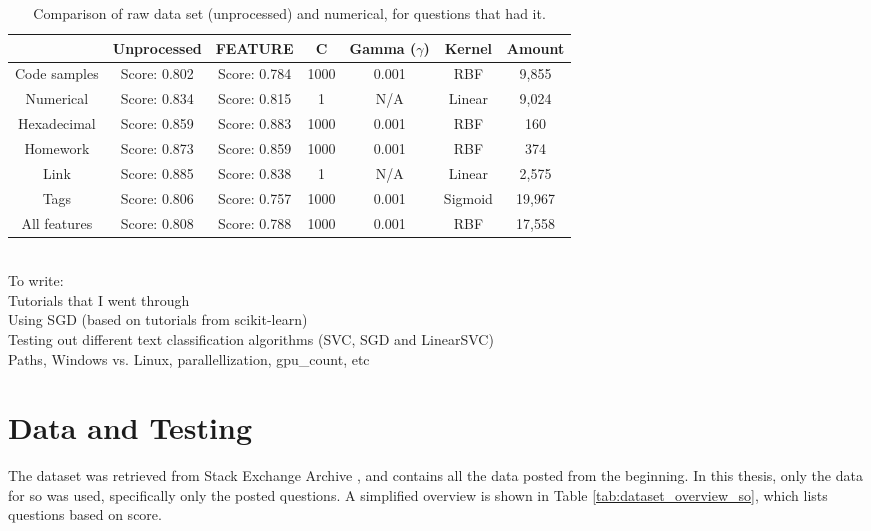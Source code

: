 \begin{table}[tbp]
	\centering
	\begin{tabular}{| c | c | c | c | c | c | c |}
		\hline
		~				& Unprocessed		& FEATURE		& C			& Gamma ($\gamma$)	& Kernel	& Amount	 	\\ \hline
		Code samples 	& Score: 0.802		& Score: 0.784	& 1000		& 0.001				& RBF 		& 9,855 		\\ \hline
		Numerical		& Score: 0.834		& Score: 0.815	& 1			& N/A				& Linear	& 9,024			\\ \hline
		Hexadecimal		& Score: 0.859		& Score: 0.883	& 1000		& 0.001				& RBF		& 160 			\\ \hline
		Homework 		& Score: 0.873		& Score: 0.859	& 1000		& 0.001				& RBF		& 374 			\\ \hline
		Link			& Score: 0.885		& Score: 0.838	& 1			& N/A				& Linear	& 2,575			\\ \hline
		Tags			& Score: 0.806		& Score: 0.757	& 1000		& 0.001				& Sigmoid	& 19,967		\\ \hline
		All features	& Score: 0.808		& Score: 0.788	& 1000		& 0.001				& RBF 		& 17,558		\\ \hline
	\end{tabular}
	\caption{Comparison of raw data set (unprocessed) and numerical, for questions that had it.}
	\label{tab:comparison_of_feature_occurences_only}
\end{table}

~\\
To write: \\
Tutorials that I went through \\
Using SGD (based on tutorials from scikit-learn) \\
Testing out different text classification algorithms (SVC, SGD and LinearSVC) \\
Paths, Windows vs. Linux, parallellization, gpu\_count, etc

\section{Data and Testing}
\label{sec:data_and_testing}
The dataset was retrieved from Stack Exchange Archive \cite{StackExchange2016}, and contains all the data posted from the beginning. 
In this thesis, only the data for \gls{so} was used, specifically only the posted questions.
A simplified overview is shown in Table \ref{tab:dataset_overview_so}, which lists questions based on score. 

